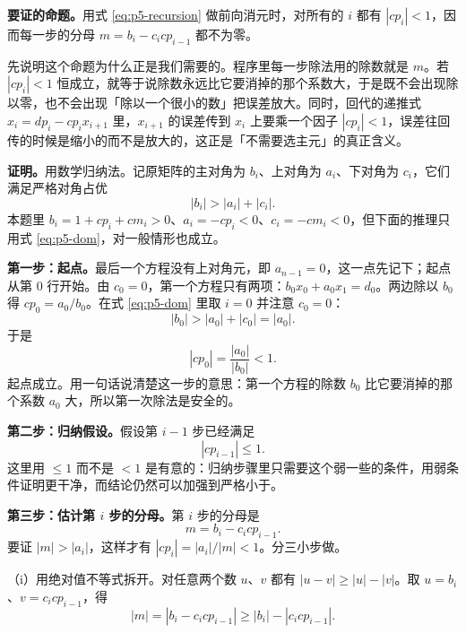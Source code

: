 \textbf{要证的命题。}用式 \eqref{eq:p5-recursion} 做前向消元时，对所有的 $i$ 都有 $|cp_i|<1$，因而每一步的分母 $m=b_i-c_icp_{i-1}$ 都不为零。

先说明这个命题为什么正是我们需要的。程序里每一步除法用的除数就是 $m$。若 $|cp_i|<1$ 恒成立，就等于说除数永远比它要消掉的那个系数大，于是既不会出现除以零，也不会出现「除以一个很小的数」把误差放大。同时，回代的递推式 $x_i=dp_i-cp_ix_{i+1}$ 里，$x_{i+1}$ 的误差传到 $x_i$ 上要乘一个因子 $|cp_i|<1$，误差往回传的时候是缩小的而不是放大的，这正是「不需要选主元」的真正含义。

\textbf{证明。}用数学归纳法。记原矩阵的主对角为 $b_i$、上对角为 $a_i$、下对角为 $c_i$，它们满足严格对角占优
\begin{equation}
\left|b_i\right|>\left|a_i\right|+\left|c_i\right| .
\label{eq:p5-dom}
\end{equation}
本题里 $b_i=1+cp_i+cm_i>0$、$a_i=-cp_i<0$、$c_i=-cm_i<0$，但下面的推理只用式 \eqref{eq:p5-dom}，对一般情形也成立。

\textbf{第一步：起点。}最后一个方程没有上对角元，即 $a_{n-1}=0$，这一点先记下；起点从第 $0$ 行开始。由 $c_0=0$，第一个方程只有两项：$b_0x_0+a_0x_1=d_0$。两边除以 $b_0$ 得 $cp_0=a_0/b_0$。在式 \eqref{eq:p5-dom} 里取 $i=0$ 并注意 $c_0=0$：
\begin{equation}
\left|b_0\right|>\left|a_0\right|+\left|c_0\right|=\left|a_0\right| .
\label{eq:p5-start}
\end{equation}
于是
\begin{equation}
\left|cp_0\right|=\frac{\left|a_0\right|}{\left|b_0\right|}<1 .
\label{eq:p5-startcp}
\end{equation}
起点成立。用一句话说清楚这一步的意思：第一个方程的除数 $b_0$ 比它要消掉的那个系数 $a_0$ 大，所以第一次除法是安全的。

\textbf{第二步：归纳假设。}假设第 $i-1$ 步已经满足
\begin{equation}
\left|cp_{i-1}\right|\le1 .
\label{eq:p5-hyp}
\end{equation}
这里用 $\le1$ 而不是 $<1$ 是有意的：归纳步骤里只需要这个弱一些的条件，用弱条件证明更干净，而结论仍然可以加强到严格小于。

\textbf{第三步：估计第 $i$ 步的分母。}第 $i$ 步的分母是
\begin{equation}
m=b_i-c_icp_{i-1} .
\label{eq:p5-mdef}
\end{equation}
要证 $|m|>|a_i|$，这样才有 $|cp_i|=|a_i|/|m|<1$。分三小步做。

（i）用绝对值不等式拆开。对任意两个数 $u$、$v$ 都有 $|u-v|\ge|u|-|v|$。取 $u=b_i$、$v=c_icp_{i-1}$，得
\begin{equation}
\left|m\right|=\left|b_i-c_icp_{i-1}\right|\ge\left|b_i\right|-\left|c_icp_{i-1}\right| .
\label{eq:p5-ineq1}
\end{equation}

